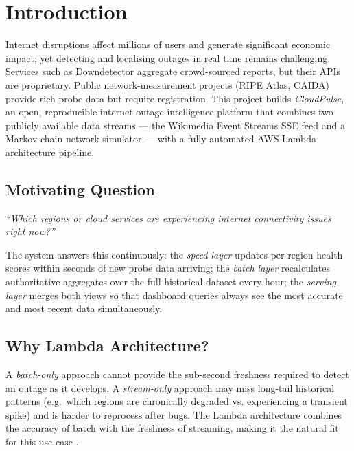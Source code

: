 \documentclass[conference]{IEEEtran}
\begin{document}
\section{Introduction}

Internet disruptions affect millions of users and generate significant economic
impact; yet detecting and localising outages in real time remains challenging.
Services such as Downdetector aggregate crowd-sourced reports, but their APIs
are proprietary. Public network-measurement projects (RIPE Atlas, CAIDA) provide
rich probe data but require registration. This project builds \textit{CloudPulse},
an open, reproducible internet outage intelligence platform that combines two
publicly available data streams — the Wikimedia Event Streams SSE feed and a
Markov-chain network simulator — with a fully automated AWS Lambda architecture
pipeline.

\subsection{Motivating Question}

\begin{center}
\textit{``Which regions or cloud services are experiencing internet connectivity
issues right now?''}
\end{center}

The system answers this continuously: the \textit{speed layer} updates per-region
health scores within seconds of new probe data arriving; the \textit{batch layer}
recalculates authoritative aggregates over the full historical dataset every
hour; the \textit{serving layer} merges both views so that dashboard queries always
see the most accurate and most recent data simultaneously.

\subsection{Why Lambda Architecture?}

A \textit{batch-only} approach cannot provide the sub-second freshness required
to detect an outage as it develops. A \textit{stream-only} approach may miss
long-tail historical patterns (e.g.\ which regions are chronically degraded vs.
experiencing a transient spike) and is harder to reprocess after bugs. The Lambda
architecture combines the accuracy of batch with the freshness of streaming,
making it the natural fit for this use case \cite{marz2015big}.
\end{document}

